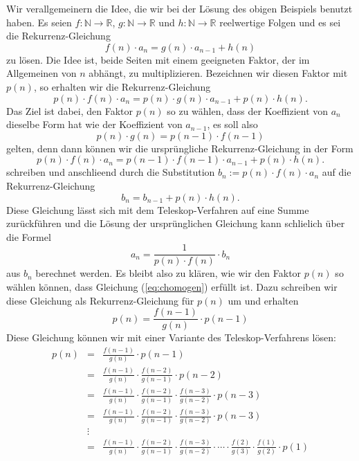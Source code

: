 Wir verallgemeinern die Idee, die wir bei der L\"osung des obigen Beispiels benutzt haben.  Es seien
$f:\mathbb{N} \rightarrow \mathbb{R}$, $g:\mathbb{N} \rightarrow \mathbb{R}$ und 
$h:\mathbb{N} \rightarrow \mathbb{R}$ 
reelwertige Folgen und es sei die Rekurrenz-Gleichung
\[ 
f(n) \cdot a_n = g(n) \cdot a_{n-1} + h(n)
\]
zu l\"osen.  Die Idee ist, beide Seiten mit einem geeigneten Faktor, der im Allgemeinen von $n$ abh\"angt, zu
multiplizieren.  Bezeichnen wir diesen Faktor mit $p(n)$, so erhalten wir die Rekurrenz-Gleichung
\[ 
p(n) \cdot f(n) \cdot a_n = p(n) \cdot g(n) \cdot a_{n-1} + p(n) \cdot h(n).
\]
Das Ziel ist dabei, den Faktor $p(n)$ so zu w\"ahlen, dass der Koeffizient von $a_n$ dieselbe Form hat wie der
Koeffizient von $a_{n-1}$, es soll also
\begin{equation}
  \label{eq:chomogen}
  p(n) \cdot g(n) = p(n-1) \cdot f(n-1)  
\end{equation}
gelten, denn dann k\"onnen wir die urspr\"ungliche Rekurrenz-Gleichung in der Form
\[ 
p(n) \cdot f(n) \cdot a_n = p(n-1) \cdot f(n-1) \cdot a_{n-1} + p(n) \cdot h(n).
\]
schreiben und anschlie\3end durch die Substitution $b_n := p(n) \cdot f(n) \cdot a_n$ auf die
Rekurrenz-Gleichung 
\[ 
b_n = b_{n-1} + p(n) \cdot h(n).
\]
Diese Gleichung l\"asst sich mit dem Teleskop-Verfahren auf eine Summe zur\"uckf\"uhren und die L\"osung der
urspr\"unglichen Gleichung kann schlie\3lich \"uber die Formel
\[ 
a_n = \frac{1}{p(n) \cdot f(n)} \cdot b_n
\]
aus $b_n$ berechnet werden.  Es bleibt also zu kl\"aren, wie wir den Faktor $p(n)$ so w\"ahlen k\"onnen, dass
Gleichung (\ref{eq:chomogen}) erf\"ullt ist. Dazu schreiben wir diese Gleichung als Rekurrenz-Gleichung f\"ur
$p(n)$ um und erhalten
\[ 
  p(n) = \frac{f(n-1)}{g(n)} \cdot p(n-1) 
\]
Diese Gleichung k\"onnen wir mit einer Variante des Teleskop-Verfahrens l\"osen:
\[ 
\begin{array}{lcl}
p(n) & = & \frac{f(n-1)}{g(n)} \cdot p(n-1)   \\[0.2cm]
     & = & \frac{f(n-1)}{g(n)} \cdot  \frac{f(n-2)}{g(n-1)} \cdot  p(n-2) \\[0.2cm]
     & = & \frac{f(n-1)}{g(n)} \cdot  \frac{f(n-2)}{g(n-1)} \cdot \frac{f(n-3)}{g(n-2)} \cdot  p(n-3) 
           \\[0.2cm]
     & = & \frac{f(n-1)}{g(n)} \cdot  \frac{f(n-2)}{g(n-1)} \cdot \frac{f(n-3)}{g(n-2)} \cdot  p(n-3) 
           \\[0.2cm]
     & \vdots & \\
     & = & \frac{f(n-1)}{g(n)} \cdot  \frac{f(n-2)}{g(n-1)} \cdot \frac{f(n-3)}{g(n-2)} \cdot \cdots
           \cdot \frac{f(2)}{g(3)} \cdot \frac{f(1)}{g(2)} \cdot p(1) 
           \\[0.2cm]
\end{array}
\]
